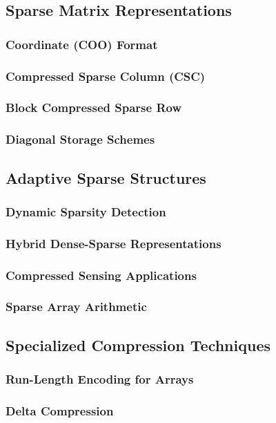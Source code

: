 \documentclass[12pt, oneside]{book}
\begin{document}
\subsection{Sparse Matrix Representations}
\subsubsection{Coordinate (COO) Format}
\subsubsection{Compressed Sparse Column (CSC)}
\subsubsection{Block Compressed Sparse Row}
\subsubsection{Diagonal Storage Schemes}

\subsection{Adaptive Sparse Structures}
\subsubsection{Dynamic Sparsity Detection}
\subsubsection{Hybrid Dense-Sparse Representations}
\subsubsection{Compressed Sensing Applications}
\subsubsection{Sparse Array Arithmetic}

\subsection{Specialized Compression Techniques}
\subsubsection{Run-Length Encoding for Arrays}
\subsubsection{Delta Compression}
\end{document}
